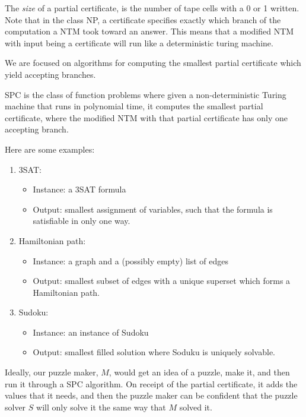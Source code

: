 \documentclass[runningheads,a4paper]{llncs}
\begin{document}
The \emph{size} of a partial certificate, is the number of tape cells with a 0 or 1 written. Note that in the class NP, a certificate specifies exactly which branch of the computation a NTM took toward an answer. This means that a modified NTM with input being a certificate will run like a deterministic turing machine. 

We are focused on algorithms for computing the smallest partial certificate which yield accepting branches.

\begin{definition}
SPC is the class of function problems where given a non-deterministic Turing machine that runs in polynomial time, it computes the smallest partial certificate, where the modified NTM with that partial certificate has only one accepting branch.
\end{definition}

Here are some examples:
\begin{enumerate}
\item 3SAT: \begin{itemize}
	\item Instance: a 3SAT formula
	\item Output: smallest assignment of variables, such that the formula is satisfiable in only one way.
		\end{itemize}
\item Hamiltonian path: \begin{itemize}
				\item Instance: a graph and a (possibly empty) list of edges
				\item Output: smallest subset of edges with a unique superset which forms a Hamiltonian path.
				\end{itemize}
\item Sudoku: \begin{itemize}
				\item Instance: an instance of Sudoku
				\item Output: smallest filled solution where Soduku is uniquely solvable.
\end{itemize}
\end{enumerate}

Ideally, our puzzle maker, $M$, would get an idea of a puzzle, make it, and then run it through a SPC algorithm. On receipt of the partial certificate, it adds the values that it needs, and then the puzzle maker can be confident that the puzzle solver $S$ will only solve it the same way that $M$ solved it.
\end{document}
